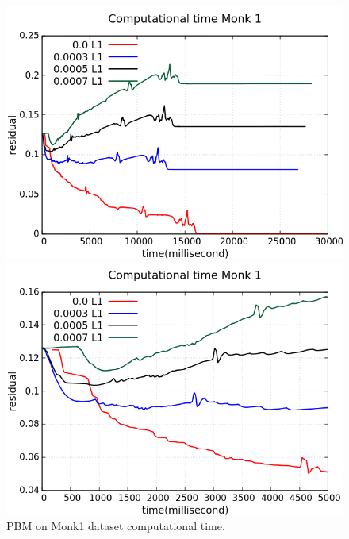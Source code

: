 \begin{figure}[H]
	\centering
	\begin{minipage}[t]{0.5\linewidth}
		\includegraphics[width=\linewidth]{data/PBM/Monk1/Monk1_PBM_CT_standard.png}
	\end{minipage}%
	\begin{minipage}[t]{0.5\linewidth}
		\includegraphics[width=\linewidth]{data/PBM/Monk1/Monk1_PBM_CT_zoom.png}
	\end{minipage}
	\caption{PBM on Monk1 dataset computational time.}
\end{figure}
